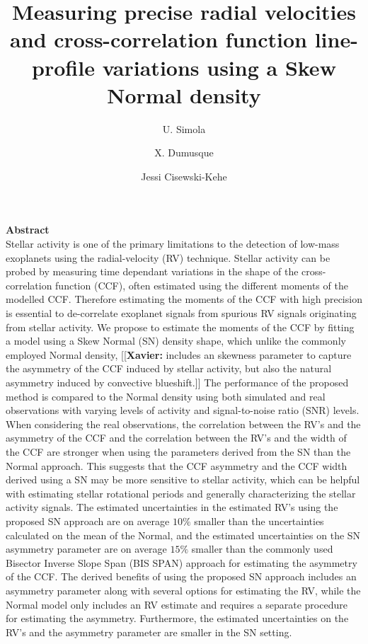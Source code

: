 \documentclass[11pt, oneside]{article}
\title{Measuring precise radial velocities and cross-correlation function line-profile variations using a Skew Normal density}
\author{U. Simola
	    \and X. Dumusque
	    \and Jessi Cisewski-Kehe
	    }
\newcommand{\xavier}[1]{{\color{blue}[[\textbf{Xavier: }#1]]}}
\begin{document}
\maketitle

{\bf Abstract}\\
Stellar activity is one of the primary limitations to the detection of low-mass exoplanets using the radial-velocity (RV) technique. 
Stellar activity can be probed by measuring time dependant variations in the shape of the cross-correlation function (CCF), often estimated using the different moments of the modelled CCF. Therefore estimating the moments of the CCF with high precision is essential to de-correlate exoplanet signals from spurious RV signals originating from stellar activity.
%
We propose to estimate the moments of the CCF by fitting a model using a Skew Normal (SN) density shape, which unlike the commonly employed Normal density, \xavier{includes an skewness parameter to capture the asymmetry of the CCF induced by stellar activity, but also the natural asymmetry induced by convective blueshift.}
%
The performance of the proposed method is compared to the Normal density using both simulated and real observations with varying levels of activity and signal-to-noise ratio (SNR) levels.
%
When considering the real observations, the correlation between the RV's and the asymmetry of the CCF and the correlation between the RV's and the width of the CCF are stronger when using the parameters derived from the SN than the Normal approach. 
This suggests that the CCF asymmetry and the CCF width derived using a SN may be more sensitive to stellar activity, which can be helpful with estimating stellar rotational periods and generally characterizing the stellar activity signals.
%
The estimated uncertainties in the estimated RV's using the proposed SN approach are on average $10\%$ smaller than the uncertainties calculated on the mean of the Normal, and the estimated uncertainties on the SN asymmetry parameter are on average $15\%$ smaller than the commonly used Bisector Inverse Slope Span (BIS SPAN) approach for estimating the asymmetry of the CCF. 
%
The derived benefits of using the proposed SN approach includes an asymmetry parameter along with several options for estimating the RV, while the Normal model only includes an RV estimate and requires a separate procedure for estimating the asymmetry.  Furthermore, the estimated uncertainties on the RV's and the asymmetry parameter are smaller in the SN setting.
\end{document}
